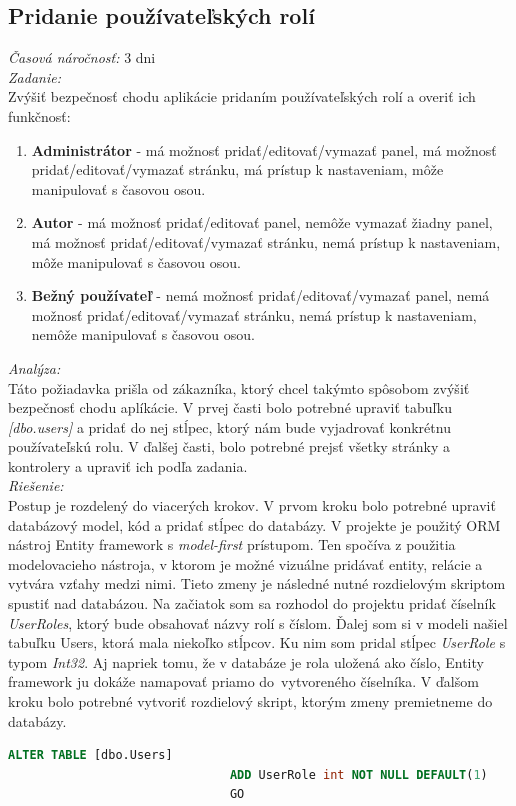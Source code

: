\documentclass[11pt, oneside]{report}
\begin{document}
\subsection{Pridanie používateľských rolí}
\textit{Časová náročnosť:} 3 dni\\
\textit{Zadanie:}\\
Zvýšiť bezpečnosť chodu aplikácie pridaním používateľských rolí a overiť ich funkčnosť:
\begin{enumerate}
\item \textbf{Administrátor} - má možnosť pridať/editovať/vymazať panel, má možnosť pridať/editovať/vymazať stránku, má prístup k nastaveniam, môže manipulovať s časovou osou.
\item \textbf{Autor} - má možnosť pridať/editovať panel, nemôže vymazať žiadny panel, má možnosť pridať/editovať/vymazať stránku, nemá prístup k nastaveniam, môže manipulovať s časovou osou.
\item \textbf{Bežný používateľ} - nemá možnosť pridať/editovať/vymazať panel, nemá možnosť pridať/editovať/vymazať stránku, nemá prístup k nastaveniam, nemôže manipulovať s časovou osou.
\end{enumerate}
\textit{Analýza:}\\
Táto požiadavka prišla od zákazníka, ktorý chcel takýmto spôsobom zvýšiť bezpečnosť chodu aplíkácie.
V prvej časti bolo potrebné upraviť tabuľku \textit{[dbo.users]} a pridať do nej stĺpec, ktorý nám bude vyjadrovať konkrétnu používateľskú rolu. V ďalšej časti, bolo potrebné prejsť všetky stránky a kontrolery a upraviť ich podľa zadania. 
\\\textit{Riešenie:}\\
Postup je rozdelený do viacerých krokov. V prvom kroku bolo potrebné upraviť databázový model, kód a  pridať stĺpec do databázy. V projekte je použitý ORM nástroj Entity framework s \textit{model-first} prístupom. Ten spočíva z použitia  modelovacieho nástroja, v ktorom je možné vizuálne pridávať entity, relácie a vytvára vzťahy medzi nimi. Tieto zmeny je následné nutné rozdielovým skriptom spustiť nad databázou. Na začiatok som sa rozhodol do projektu pridať číselník \textit{UserRoles}, ktorý bude obsahovať  názvy rolí s číslom. Ďalej som si v modeli našiel tabuľku Users, ktorá mala niekoľko stĺpcov.  Ku nim som pridal stĺpec \textit{UserRole} s typom \textit{Int32}. Aj napriek tomu, že v databáze je rola uložená ako číslo, Entity framework ju dokáže namapovať priamo do~vytvoreného číselníka. V ďalšom kroku bolo potrebné vytvoriť rozdielový skript, ktorým zmeny premietneme do databázy.
\begin{lstlisting}[language=SQL,caption=SQL skript pre pridanie používateľelskej role,captionpos=b]
						       ALTER TABLE [dbo.Users]
						       ADD UserRole int NOT NULL DEFAULT(1)
						       GO
\end{lstlisting}
\end{document}
